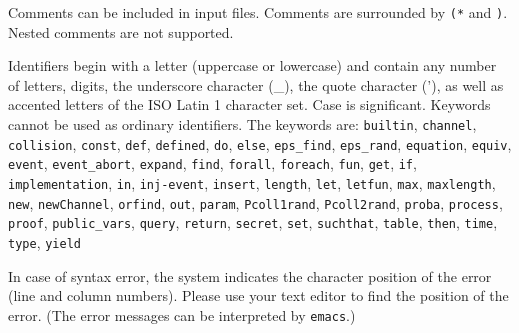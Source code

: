 
\ifchannels

\def\iprocess{\nonterm{iprocess}}
\def\oprocess{\nonterm{oprocess}}

\else

\def\iprocess{\nonterm{odef}}
\def\oprocess{\nonterm{obody}}

\fi

\def\fungroup{\nonterm{ogroup}}
\def\funmode{\nonterm{omode}}
\def\funbody{\nonterm{obody\_equiv}}
\def\Resavt{\texttt{new\ }\nonterm{vartype}}
\def\Resa#1#2{\texttt{new\ }{#1}\texttt{:}{#2}}
\def\Resbvt{\nonterm{ident}\texttt{ <-R }\nonterm{ident}}
\def\Resb#1#2{{#1}\texttt{ <-R }{#2}}
\def\yield{\texttt{yield}}

\def\epsrand#1{\texttt{eps\_rand(}#1\texttt{)}}

\newcommand{\eqt}{\mathrel{\texttt{=}}}
\newcommand{\leqt}{\mathrel{\texttt{<=}}}


Comments can be included in input files. Comments are surrounded by
{\tt (*} and {\tt *)}. Nested comments are not supported.

Identifiers begin with a letter (uppercase or lowercase) and contain
any number of letters, digits, the underscore character (\_),
the quote character ('), as well as accented letters of the ISO Latin 1
character set. Case is significant. 
Keywords cannot be used as ordinary identifiers. The keywords are:
{\tt builtin}, {\tt channel}, 
{\tt collision}, {\tt const}, {\tt def}, 
{\tt defined}, {\tt do}, {\tt else}, {\tt eps\_find}, 
{\tt eps\_rand}, {\tt equation}, {\tt equiv}, 
{\tt event}, {\tt event\string_abort}, {\tt expand}, {\tt find}, 
{\tt forall}, {\tt foreach}, {\tt fun}, 
{\tt get}, {\tt if}, {\tt implementation}, {\tt in}, {\tt inj-event}, 
{\tt insert}, {\tt length}, {\tt let}, {\tt letfun}, {\tt max}, {\tt maxlength},
{\tt new}, {\tt newChannel}, {\tt orfind}, 
{\tt out}, {\tt param}, {\tt Pcoll1rand}, {\tt Pcoll2rand}, 
{\tt proba}, {\tt process}, 
{\tt proof}, {\tt public\_vars}, {\tt query}, {\tt return},
{\tt secret}, {\tt set}, {\tt suchthat}, {\tt table}, 
{\tt then}, {\tt time}, {\tt type}, {\tt yield}%

In case of syntax error, the system indicates the character position
of the error (line and column numbers). Please use your text editor to
find the position of the error. (The error messages can be interpreted
by \texttt{emacs}.)

